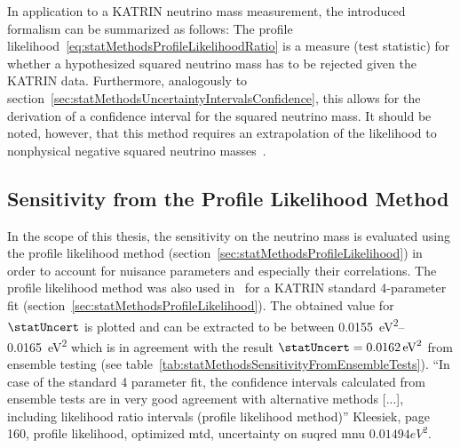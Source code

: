 In application to a KATRIN neutrino mass measurement, the introduced formalism can be summarized as follows: The profile likelihood~\eqref{eq:statMethodsProfileLikelihoodRatio} is a measure (test statistic) for whether a hypothesized squared neutrino mass has to be rejected given the KATRIN data. Furthermore, analogously to section~\ref{sec:statMethodsUncertaintyIntervalsConfidence}, this allows for the derivation of a confidence interval for the squared neutrino mass. It should be noted, however, that this method requires an extrapolation of the likelihood to nonphysical negative squared neutrino masses~\cite{Kleesiek2014}.


\subsection{Sensitivity from  the Profile Likelihood Method}
In the scope of this thesis, the sensitivity on the neutrino mass is evaluated using the profile likelihood method (section~\ref{sec:statMethodsProfileLikelihood}) in order to account for nuisance parameters and especially their correlations. The profile likelihood method was also used in~\cite{Kleesiek2014} for a KATRIN standard 4-parameter fit (section~\ref{sec:statMethodsProfileLikelihood}). The obtained value for $\statUncert$ is plotted and can be extracted to be between \SIrange[range-phrase=--]{0.0155}{0.0165}{eV^2} which is in agreement with the result $\statUncert=\SI{0.0162}{eV^2}$ from ensemble testing (see table~\ref{tab:statMethodsSensitivityFromEnsembleTests}). ``In case of the standard 4 parameter fit, the confidence intervals calculated from ensemble tests are in very good agreement with alternative methods [...], including likelihood ratio intervals (profile likelihood method)'' Kleesiek, page 160, profile likelihood, optimized mtd, uncertainty on suqred mnu $0.01494 eV^2$.



